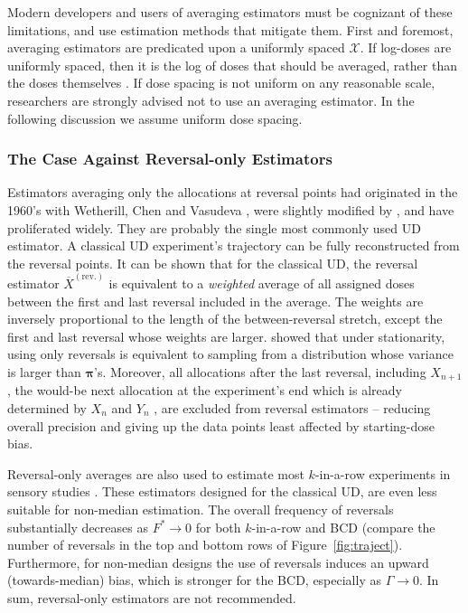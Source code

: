 Modern developers and users of averaging estimators must be cognizant of these limitations, and use estimation methods that mitigate them. First and foremost, averaging estimators are predicated upon a uniformly spaced $\mathcal{X}$. If log-doses are uniformly spaced, then it is the log of doses that should be averaged, rather than the doses themselves \citep{Garc:Pere:Forc:1998,Oron07}. If dose spacing is not uniform on any reasonable scale, researchers are strongly advised not to use an averaging estimator. In the following discussion we assume uniform dose spacing.

\subsubsection{The Case Against Reversal-only Estimators}

Estimators averaging only the allocations at reversal points had originated in the 1960's with Wetherill, Chen and Vasudeva \citep{Weth:Chen:Vasu:est:1966}, were slightly modified by \citet{Choi:est:1971}, and have proliferated widely. They are probably the single most commonly used UD estimator. A classical UD experiment's trajectory can be fully reconstructed from the reversal points. It can be shown that for the classical UD, the reversal estimator $\overline{X}^\mathrm{(rev.)}$ is equivalent to a \emph{weighted} average of all assigned doses between the first and last reversal included in the average. The weights are inversely proportional to the length of the between-reversal stretch, except the first and last reversal whose weights are larger. \cite[Ch. 3]{Oron07} showed that under stationarity, using only reversals is equivalent to sampling from a distribution whose variance is larger than $\boldsymbol{\pi}$'s. Moreover, all allocations after the last reversal, including $X_{n+1}$, the would-be next allocation at the experiment's end which is already determined by $X_n$ and $Y_n$ \citep{BrownleeEtAl53}, are excluded from reversal estimators -- reducing overall precision and giving up the data points least affected by starting-dose bias.

Reversal-only averages are also used to estimate most $k$-in-a-row experiments in sensory studies \citep{Garc:Pere:Forc:1998}. These estimators designed for the classical UD, are even less suitable for non-median estimation. The overall frequency of reversals substantially decreases as $F^*\to 0$ for both $k$-in-a-row and BCD (compare the number of reversals in the top and bottom rows of Figure~\ref{fig:traject}). Furthermore, for non-median designs the use of reversals induces an upward (towards-median) bias, which is stronger for the BCD, especially as $\Gamma\to 0$. In sum, reversal-only estimators are not recommended.

